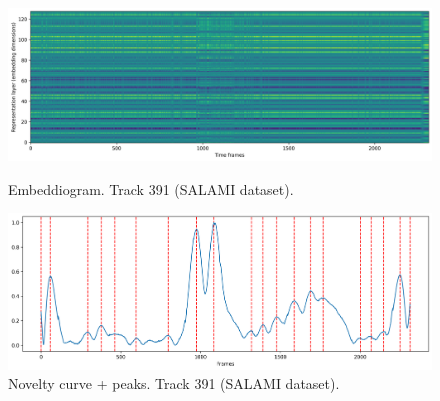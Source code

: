 \begin{figure}[ht]
  \centering
  \begin{minipage}[b]{1.0\linewidth}
    \centering
    \includegraphics[width=\linewidth]{figures/images/salami_391_embeddiogram.png}
    \caption[Embeddiogram. Track 391 (SALAMI dataset).]{Embeddiogram. Track 391 (SALAMI dataset).}
    \label{fig:image1}
  \end{minipage}

  \begin{minipage}[b]{1.0\linewidth}
    \centering
    \includegraphics[width=\linewidth]{figures/images/samali_391_novelty_curve_peaks.png}
    \caption[Novelty curve + peaks. Track 391 (SALAMI dataset).]{Novelty curve + peaks. Track 391 (SALAMI dataset).}
    \label{fig:image2}
  \end{minipage}
\end{figure}


